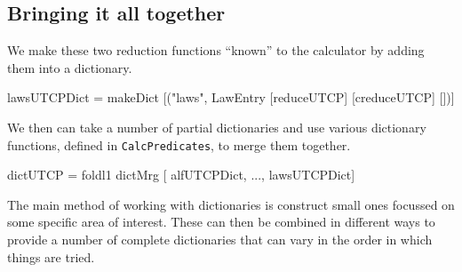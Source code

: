 %
%


\subsection{Bringing it all together}

We make these two reduction functions ``known'' to the calculator
by adding them into a dictionary.
\begin{code}
lawsUTCPDict
 = makeDict [("laws", LawEntry [reduceUTCP] [creduceUTCP] [])]
\end{code}
We then can take a number of partial dictionaries and use various
dictionary functions,
defined in \texttt{CalcPredicates}, to merge them together.
\begin{code}
dictUTCP = foldl1 dictMrg [ alfUTCPDict, ..., lawsUTCPDict]
\end{code}
The main method of working with dictionaries is construct small ones
focussed on some specific area of interest.
These can then be combined in different ways to provide a number of complete
dictionaries that can vary in the order in which things are tried.









